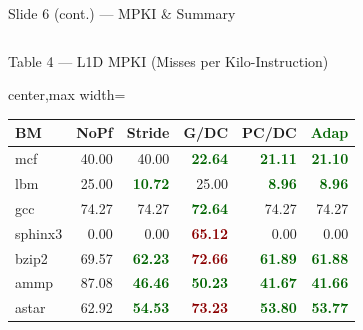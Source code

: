 \documentclass[aspectratio=169,t]{beamer}
\newcommand{\good}[1]{\textcolor{darkgreen}{\textbf{#1}}}
\newcommand{\bad}[1]{\textcolor{darkred}{\textbf{#1}}}
\begin{document}
\begin{frame}{Slide 6 (cont.) --- MPKI \& Summary}
\begin{columns}[T,totalwidth=\textwidth]
\begin{block}{Table 4 --- L1D MPKI (Misses per Kilo-Instruction)}
\tiny
\setlength{\tabcolsep}{2pt}
\centering
\begin{adjustbox}{center,max width=\linewidth}
\begin{tabular}{@{}l r r r r r@{}}
\toprule
\textbf{BM} & \textbf{NoPf} & \textbf{Stride} & \textbf{G/DC} & \textbf{PC/DC} & \textbf{\good{Adap}}\\
\midrule
mcf     & 40.00 & 40.00  & \good{22.64}  & \good{21.11}  & \good{21.10}\\
lbm     & 25.00 & \good{10.72} & 25.00  & \good{8.96}   & \good{8.96}\\
gcc     & 74.27 & 74.27  & \good{72.64}  & 74.27  & 74.27\\
sphinx3 & 0.00  & 0.00   & \bad{65.12}   & 0.00   & 0.00\\
bzip2   & 69.57 & \good{62.23} & \bad{72.66} & \good{61.89} & \good{61.88}\\
ammp    & 87.08 & \good{46.46} & \good{50.23} & \good{41.67} & \good{41.66}\\
astar   & 62.92 & \good{54.53} & \bad{73.23} & \good{53.80} & \good{53.77}\\
\bottomrule
\end{tabular}
\end{adjustbox}
\end{block}


\end{columns}
\end{frame}
\end{document}
